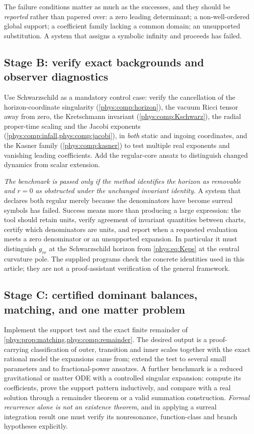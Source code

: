 \documentclass[11pt,letterpaper]{article}
\numberwithin{equation}{section}
\theoremstyle{definition}
\theoremstyle{remark}
\begin{document}
The failure conditions matter as much as the successes, and they should be
\emph{reported} rather than papered over: a zero leading determinant; a
non-well-ordered global support; a coefficient family lacking a common domain;
an unsupported substitution. A system that assigns a symbolic infinity and
proceeds has failed.

\subsection{Stage B: verify exact backgrounds and observer diagnostics}
\label{phys:sub:stageB}

Use Schwarzschild as a mandatory control case: verify the cancellation of the
horizon-coordinate singularity (\cref{phys:comp:horizon}), the vacuum Ricci
tensor away from zero, the Kretschmann invariant
(\cref{phys:comp:Kschwarz}), the radial proper-time scaling and the Jacobi
exponents (\cref{phys:comp:infall,phys:comp:jacobi}), in \emph{both} static and
ingoing coordinates, and the Kasner family (\cref{phys:comp:kasner}) to test
multiple real exponents and vanishing leading coefficients. Add the
regular-core ansatz to distinguish changed dynamics from scalar extension.

\emph{The benchmark is passed only if the method identifies the horizon as
removable and $r=0$ as obstructed under the unchanged invariant identity.} A
system that declares both regular merely because the denominators have become
surreal symbols has failed. Success means more than producing a large
expression: the tool should retain units, verify agreement of invariant
quantities between charts, certify which denominators are units, and report
when a requested evaluation meets a zero denominator or an unsupported
expansion. In particular it must distinguish $g_{rr}$ at the Schwarzschild
horizon from \eqref{phys:eq:Keps} at the central curvature pole. The supplied
programs check the concrete identities used in this article; they are not a
proof-assistant verification of the general framework.

\subsection{Stage C: certified dominant balances, matching, and one matter
problem}
\label{phys:sub:stageC}

Implement the support test and the exact finite remainder of
\cref{phys:prop:matching,phys:comp:remainder}. The desired output is a
proof-carrying classification of outer, transition and inner scales together
with the exact rational model the expansions came from; extend the test to
several small parameters and to fractional-power ansatzes. A further benchmark
is a reduced gravitational or matter ODE with a controlled singular expansion:
compute its coefficients, prove the support pattern inductively, and compare
with a real solution through a remainder theorem or a valid summation
construction. \emph{Formal recurrence alone is not an existence theorem}, and
in applying a surreal integration result one must verify its nonresonance,
function-class and branch hypotheses explicitly.
\end{document}
